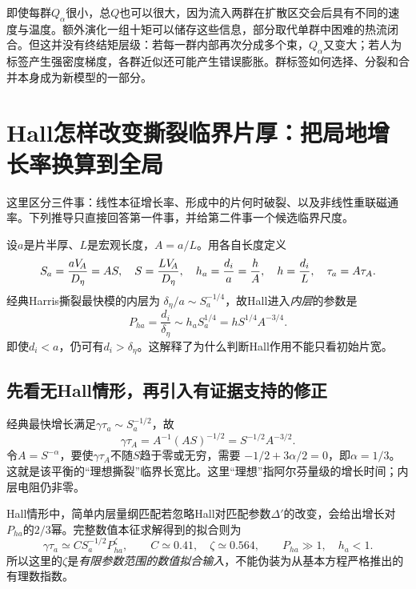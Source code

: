 即使每群$Q_\alpha$很小，总$Q$也可以很大，因为流入两群在扩散区交会后具有不同的速度与温度。额外演化一组十矩可以储存这些信息，部分取代单群中困难的热流闭合。但这并没有终结矩层级：若每一群内部再次分成多个束，$Q_\alpha$又变大；若人为标签产生强密度梯度，各群近似还可能产生错误膨胀。群标签如何选择、分裂和合并本身成为新模型的一部分。

\section{Hall怎样改变撕裂临界片厚：把局地增长率换算到全局}
这里区分三件事：线性本征增长率、形成中的片何时破裂、以及非线性重联磁通率。下列推导只直接回答第一件事，并给第二件事一个候选临界尺度。\citep{L236,L262}

设$a$是片半厚、$L$是宏观长度，$A=a/L$。用各自长度定义
\begin{equation}
 S_a=\frac{aV_{\!A}}{D_\eta}=AS,\quad
 S=\frac{LV_{\!A}}{D_\eta},\quad h_a=\frac{d_i}{a}=\frac{h}{A},\quad
 h=\frac{d_i}{L},\quad \tau_a=A\tau_A.
\end{equation}
经典Harris撕裂最快模的内层为
$\delta_\eta/a\sim S_a^{-1/4}$，故Hall进入\emph{内层}的参数是
\begin{equation}
 P_{ha}=\frac{d_i}{\delta_\eta}\sim h_a S_a^{1/4}
        =hS^{1/4}A^{-3/4}.
\end{equation}
即使$d_i<a$，仍可有$d_i>\delta_\eta$。这解释了为什么判断Hall作用不能只看初始片宽。

\subsection{先看无Hall情形，再引入有证据支持的修正}
经典最快增长满足$\gamma\tau_a\sim S_a^{-1/2}$，故
\begin{equation}
 \gamma\tau_A=A^{-1}(AS)^{-1/2}=S^{-1/2}A^{-3/2}.
\end{equation}
令$A=S^{-\alpha}$，要使$\gamma\tau_A$不随$S$趋于零或无穷，需要
$-1/2+3\alpha/2=0$，即$\alpha=1/3$。这就是该平衡的“理想撕裂”临界长宽比。这里“理想”指阿尔芬量级的增长时间；内层电阻仍非零。

Hall情形中，简单内层量纲匹配若忽略Hall对匹配参数$\Delta'$的改变，会给出增长对$P_{ha}$的$2/3$幂。完整数值本征求解得到的拟合则为
\begin{equation}
 \gamma\tau_a\simeq C S_a^{-1/2}P_{ha}^{\zeta},
 \qquad C\simeq0.41,\quad\zeta\simeq0.564,
 \qquad P_{ha}\gg1,\quad h_a<1.
\end{equation}
所以这里的$\zeta$是\emph{有限参数范围的数值拟合输入}，不能伪装为从基本方程严格推出的有理数指数。

